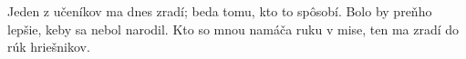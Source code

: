 Jeden z učeníkov ma dnes zradí; beda tomu, kto to spôsobí.
\versseparator
Bolo by preňho lepšie, keby sa nebol narodil.
\versseparator
Kto so mnou namáča ruku v mise, ten ma zradí do rúk hriešnikov.